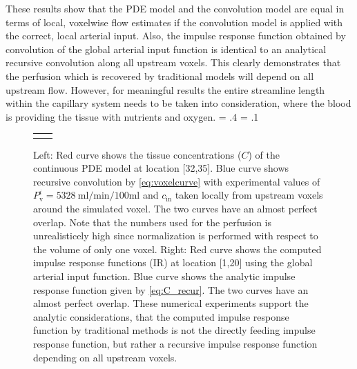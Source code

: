 \documentclass[journal,twocolumn]{IEEEtran}
\newcommand{\Perfv}{P_{\mathrm{v}}}
\newcommand{\siPml}{\milli\litre\per\minute\per100\milli\litre}
\newlength{\fwd}
\newlength{\fht}
\begin{document}
These results show that the PDE model and the convolution model are equal in terms of local, voxelwise flow estimates if the convolution model is applied with the correct, local arterial input. 
Also, the impulse response function obtained by convolution of the global arterial input function is identical to an analytical recursive convolution along all upstream voxels. 
This clearly demonstrates that the perfusion which is recovered by traditional models will depend on all upstream flow.
However, for meaningful results the entire streamline length within the capillary system needs to be taken into consideration, where the blood is providing the tissue with nutrients and oxygen. 
	\fwd = .4\textwidth
	\fht = .1\textheight	
	\begin{figure}
		{
		\small
		\begin{tabular}{c c}
			 & \\
		\end{tabular}
		}
		\caption{Left: Red curve shows the tissue concentrations ($C$) of the continuous PDE model at location [32,35]. Blue curve shows recursive convolution by \eqref{eq:voxelcurve} with experimental values of $\Perfv^i=\SI{5328}{\siPml}$ and $c_{\mathrm{in}}$ taken locally from upstream voxels around the simulated voxel. The two curves have an almost perfect overlap. Note that the numbers used for the perfusion is unrealisticely high since normalization is performed with respect to the volume of only one voxel. Right: Red curve shows the computed impulse response functions (IR) at location [1,20] using the global arterial input function. Blue curve shows the analytic impulse response function given by \eqref{eq:C_recur}. The two curves have an almost perfect overlap. These numerical experiments support the analytic considerations, that the computed impulse response function by traditional methods is not the directly feeding impulse response function, but rather a recursive impulse response function depending on all upstream voxels.}\label{fig:VoxelComp}
	\end{figure}
	

	
\end{document}
